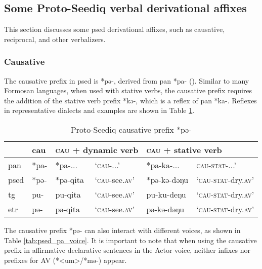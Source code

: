 \subsection{Some Proto-Seediq verbal derivational affixes} \label{sec:psed_deri_affixes}

This section discusses some \acl{psed} derivational affixes, such as causative, reciprocal, and other verbalizers.

\subsubsection{Causative}

The causative prefix in \acl{psed} is *pə-, derived from \acl{pan} *pa- (\cite{ACD,ross_zeitoun2023}). Similar to many Formosan languages, when used with stative verbs, the causative prefix requires the addition of the stative verb prefix *kə-, which is a reflex of \ac{pan} *ka-. Reflexes in representative dialects and examples are shown in Table \ref{tab:psed_pa}.

\begin{table}[!htbp]
\centering
\caption{Proto-Seediq causative prefix *pə-}
\label{tab:psed_pa}
\begin{tabular}{llllll}
\hline
 & \acs{cau} & \multicolumn{2}{l}{\textsc{cau} + dynamic verb} & \multicolumn{2}{l}{\textsc{cau} + stative verb} \\ \hline
\ac{pan}  & *pa- & *pa-...  & `\textsc{cau}-...' & *pa-ka-...  & \textsc{cau-stat}-...'  \\
\ac{psed} & *pə- & *pə-qita & `\textsc{cau}-see.\textsc{av}' & *pə-kə-dəŋu & `\textsc{cau-stat}-dry.\textsc{av}' \\
\ac{tg}   & pu-  & pu-qita  & `\textsc{cau}-see.\textsc{av}' & pu-ku-deŋu  & `\textsc{cau-stat}-dry.\textsc{av}' \\
\ac{etr}  & pə-  & pə-qita  & `\textsc{cau}-see.\textsc{av}' & pə-kə-dəŋu  & `\textsc{cau-stat}-dry.\textsc{av}' \\ \hline
\end{tabular}
\end{table}

The causative prefix *pə- can also interact with different voices, as shown in Table \ref{tab:psed_pa_voice}. It is important to note that when using the causative prefix in affirmative declarative sentences in the Actor voice, neither infixes nor prefixes for AV (*<um>/*mə-) appear.

